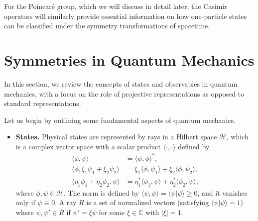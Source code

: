 For the Poincaré group, which we will discuss in detail later, the Casimir operators will similarly provide essential information on how one-particle states can be classified under the symmetry transformations of spacetime.

\section{Symmetries in Quantum Mechanics}

In this section, we review the concepts of states and observables in quantum mechanics, with a focus on the role of projective representations as opposed to standard representations. 

Let us begin by outlining some fundamental aspects of quantum mechanics.

\begin{itemize}
    \item \textbf{States.} Physical states are represented by rays in a Hilbert space $\mathcal{H}$, which is a complex vector space with a scalar product $\langle \cdot, \cdot \rangle$ defined by
    \begin{subequations}
        \begin{align}
            \langle \phi, \psi \rangle &= \langle \psi, \phi \rangle^*, \\
            \langle \phi, \xi_1 \psi_1 + \xi_2 \psi_2 \rangle &= \xi_1 \langle \phi, \psi_1 \rangle + \xi_2 \langle \phi, \psi_2 \rangle, \\
            \langle \eta_1 \phi_1 + \eta_2 \phi_2, \psi \rangle &= \eta_1^* \langle \phi_1, \psi \rangle + \eta_2^* \langle \phi_2, \psi \rangle,
        \end{align}
    \end{subequations}
    where $\phi, \psi \in \mathcal{H}$. The norm is defined by $\langle \psi, \psi \rangle = \langle \psi | \psi \rangle \geq 0$, and it vanishes only if $\psi \equiv 0$. A ray $R$ is a set of normalized vectors (satisfying $\langle \psi | \psi \rangle = 1$) where $\psi, \psi' \in R$ if $\psi' = \xi \psi$ for some $\xi \in \mathbb{C}$ with $|\xi| = 1$.
    

\end{itemize}
